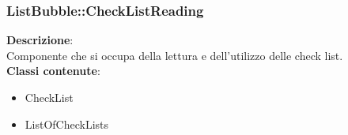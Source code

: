 \clearpage

\subsubsection{ListBubble::CheckListReading}
   \FloatBarrier
\FloatBarrier
\textbf{Descrizione}:\\
 Componente che si occupa della lettura e dell'utilizzo delle check list. 
\\ \textbf{Classi contenute}:\\
\begin{itemize}
\item CheckList
\item ListOfCheckLists
\end{itemize}


\clearpage

